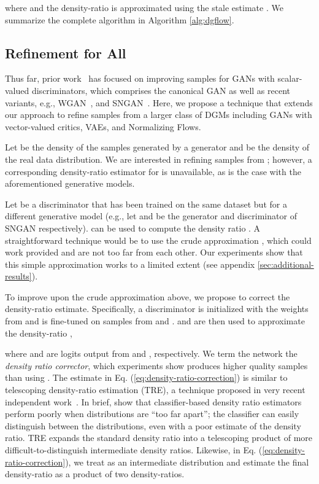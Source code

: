 \documentclass{article} \usepackage{iclr2021_conference,times}
\begin{document}
where  and the density-ratio  is approximated using the stale estimate . We summarize the complete algorithm in Algorithm \ref{alg:dgflow}.
\subsection{Refinement for All}
\label{sec:refinement-for-all}


Thus far, prior work~\citep{azadi2018discriminator,turner2019metropolis,tanaka2019discriminator,che2020your} has focused on improving samples for GANs with scalar-valued discriminators, which comprises the canonical GAN as well as recent variants, e.g., WGAN~\citep{gulrajani2017improved}, and SNGAN~\citep{miyato2018spectral}. Here, we propose a technique that extends our approach to refine samples from a larger class of DGMs including GANs with vector-valued critics, VAEs, and Normalizing Flows.

Let  be the density of the samples generated by a generator  and  be the density of the real data distribution. We are interested in refining samples from ; however, a corresponding density-ratio estimator for  is unavailable, as is the case with the aforementioned generative models.

Let  be a discriminator that has been trained on the same dataset but for a different generative model  (e.g., let  and  be the generator and discriminator of SNGAN respectively).  can be used to compute the density ratio . A straightforward technique would be to use the crude approximation , which could work provided  and  are not too far from each other. Our experiments show that this simple approximation works to a limited extent (see appendix \ref{sec:additional-results}). 

To improve upon the crude approximation above, we propose to correct the density-ratio estimate. Specifically, a discriminator  is initialized with the weights from  and is fine-tuned on samples from  and .  and  are then used to approximate the density-ratio ,

where  and  are logits output from  and , respectively. We term the network  the \emph{density ratio corrector}, which experiments show produces higher quality samples than using . The estimate in Eq. (\ref{eq:density-ratio-correction}) is similar to telescoping density-ratio estimation (TRE), a technique proposed in very recent independent work~\citep{rhodes2020telescoping}. In brief, \citet{rhodes2020telescoping} show that classifier-based density ratio estimators perform poorly when distributions are ``too far apart'';   
 the classifier can easily distinguish between the distributions, even with a poor estimate of the density ratio. TRE expands the standard density ratio into a telescoping product of more difficult-to-distinguish intermediate density ratios. Likewise, in Eq. (\ref{eq:density-ratio-correction}), we treat  as an intermediate distribution and estimate the final density-ratio as a product of two density-ratios.
\end{document}
